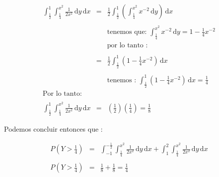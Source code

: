 \documentclass[12pt]{article}
\begin{document}
    \begin{equation*}
        \begin{array}{rcl}
            \displaystyle \int_{\frac{1}{2}}^{1} \int_{\frac{1}{4}}^{x^2} \frac{1}{2x^2} \,\mathrm{d}y  \,\mathrm{d}x  & = & \displaystyle  \frac{1}{2} \int_{\frac{1}{2}}^{1} \left(\int_{\frac{1}{4}}^{x^2}x^{-2}\,\mathrm{d}y \right) \,\mathrm{d}x 
            \\
            \\
            && \mbox{tenemos que: $\displaystyle \int_{\frac{1}{4}}^{x^2}x^{-2}\,\mathrm{d}y  = 1 - \frac{1}{4} x^{-2}$} 
            \\
            && \mbox{por lo tanto : }
            \\
            \\
            & = & \displaystyle  \frac{1}{2} \int_{\frac{1}{2}}^{1} \left(1 - \frac{1}{4} x^{-2}\right) \,\mathrm{d}x 
            \\
            \\
            && \mbox{tenemos : $\displaystyle  \int_{\frac{1}{2}}^{1} \left(1 - \frac{1}{4} x^{-2}\right) \,\mathrm{d}x = \frac{1}{4} $}
            \\
            \mbox{Por lo tanto: }
            \\
            \\
            \displaystyle \int_{\frac{1}{2}}^{1} \int_{\frac{1}{4}}^{x^2} \frac{1}{2x^2} \,\mathrm{d}y  \,\mathrm{d}x & = & \displaystyle \left(\frac{1}{2} \right) \left(\frac{1}{4}\right) = \frac{1}{8}
        \end{array}
    \end{equation*}

    \begin{flushleft}
        Podemos concluir entonces que : 
    \end{flushleft}

    \begin{equation*}
        \begin{array}{rcl}
            P\left(Y>\frac{1}{4}\right) &= &  \displaystyle \int_{-1}^{- \frac{1}{2}} \int_{\frac{1}{4}}^{x^2} \frac{1}{2x^2} \,\mathrm{d}y  \,\mathrm{d}x  + \int_{1}^{2} \int_{\frac{1}{4}}^{x^2} \frac{1}{2x^2} \,\mathrm{d}y  \,\mathrm{d}x         
            \\
            \\
            P\left(Y>\frac{1}{4}\right) &= & \displaystyle  \frac{1}{8} + \frac{1}{8} = \frac{1}{4}
        \end{array}
    \end{equation*}
\end{document}
